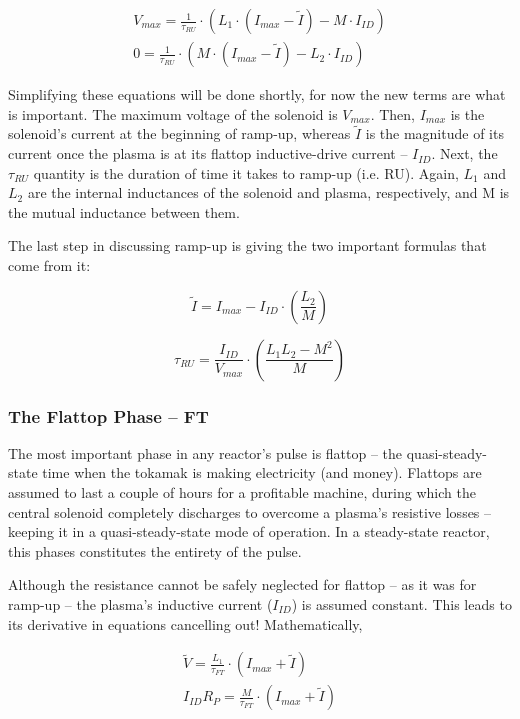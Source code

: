 \begin{align}
	V_{max} = \frac{1}{\tau_{RU}} \cdot \left( L_1 \cdot ( I_{max} - \tilde I ) - M \cdot I_{ID} \right) \\
	0 = \frac{1}{\tau_{RU}} \cdot \left( M \cdot ( I_{max} - \tilde I ) - L_2 \cdot I_{ID} \right)
\end{align}

Simplifying these equations will be done shortly, for now the new terms are what is important. The maximum voltage of the solenoid is $V_{max}$. Then, $I_{max}$ is the solenoid's current at the beginning of ramp-up, whereas $\tilde I$ is the magnitude of its current once the plasma is at its flattop inductive-drive current -- $I_{ID}$. Next, the $\tau_{RU}$ quantity is the duration of time it takes to ramp-up (i.e. RU). Again, $L_1$ and $L_2$ are the internal inductances of the solenoid and plasma, respectively, and M is the mutual inductance between them.

The last step in discussing ramp-up is giving the two important formulas that come from it:

\begin{equation}
	\tilde I = I_{max} - I_{ID} \cdot \left( \frac{L_2}{M} \right)
\end{equation}

\begin{equation}
	\label{eq:tauru}
	\tau_{RU} = \frac{I_{ID}}{V_{max}} \cdot \left( \frac{ L_1 L_2 - M^2 }{ M } \right)
\end{equation}

\subsubsection{The Flattop Phase -- FT}

The most important phase in any reactor's pulse is flattop -- the quasi-steady-state time when the tokamak is making electricity (and money). Flattops are assumed to last a couple of hours for a profitable machine, during which the central solenoid completely discharges to overcome a plasma's resistive losses -- keeping it in a quasi-steady-state mode of operation. In a steady-state reactor, this phases constitutes the entirety of the pulse.

Although the resistance cannot be safely neglected for flattop -- as it was for ramp-up -- the plasma's inductive current ($I_{ID}$) is assumed constant. This leads to its derivative in equations cancelling out! Mathematically,

\begin{align}
	\tilde V = \frac{L_1}{\tau_{FT}} \cdot \left( I_{max} + \tilde I \right) \\
	I_{ID} R_P = \frac{M}{\tau_{FT}} \cdot \left( I_{max} + \tilde I \right)
\end{align}

